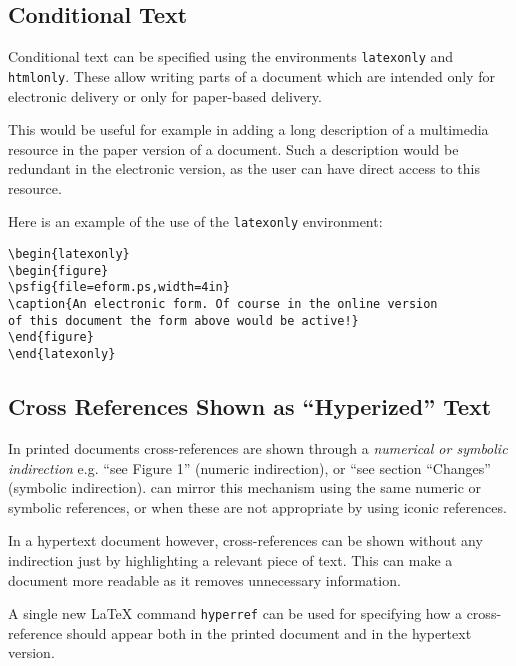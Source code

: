 \subsection{Conditional Text}
\label{sec:latexonly}
 
Conditional text can be specified using the environments {\tt latexonly} and {\tt
htmlonly}. These allow writing parts of a document which are intended
only for electronic delivery or only for paper-based delivery. 

This would be useful for example in adding a long description of a
multimedia resource in the paper version of a document. Such a
description would be redundant in the electronic version, as the user
can have direct access to this resource. 

Here is an example of the use of the {\tt latexonly} environment:

\begin{verbatim}
\begin{latexonly}
\begin{figure}
\psfig{file=eform.ps,width=4in}
\caption{An electronic form. Of course in the online version 
of this document the form above would be active!}
\end{figure}
\end{latexonly}
\end{verbatim} 

\subsection{Cross References Shown as ``Hyperized'' Text}

In printed documents cross-references are shown through a {\em numerical
or symbolic indirection} e.g. ``see Figure 1'' (numeric indirection), or
``see section ``Changes'' (symbolic indirection).  \latextohtml can
mirror this mechanism using the same numeric or symbolic references,
or when these are
not appropriate by using iconic references.

In a hypertext document however, cross-references can be shown 
without any indirection just by highlighting a relevant piece of
text. This can make a document more readable as it removes unnecessary
information. 

A single new LaTeX command {\tt hyperref} can be used for
specifying how a cross-reference should appear both in the printed
document and in the hypertext version.

